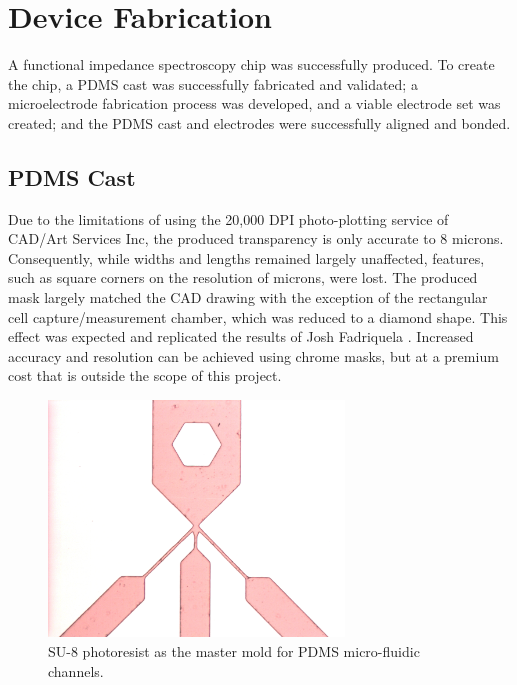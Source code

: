 
\section{Device Fabrication}

\par A functional impedance spectroscopy chip was successfully produced. To create the chip, a PDMS cast was successfully fabricated and validated; a microelectrode fabrication process was developed, and a viable electrode set was created; and the PDMS cast and electrodes were successfully aligned and bonded.

\subsection{PDMS Cast}
\label{sec:PDMS_cast_fabrication}

\par Due to the limitations of using the 20,000 DPI photo-plotting service of CAD/Art Services Inc, the produced transparency is only accurate to 8 microns. Consequently, while widths and lengths remained largely unaffected, features, such as square corners on the resolution of microns, were lost. The produced mask largely matched the CAD drawing with the exception of the rectangular cell capture/measurement chamber, which was reduced to a diamond shape. This effect was expected and replicated the results of Josh Fadriquela \cite{fadriquela_design_2009-1}. Increased accuracy and resolution can be achieved using chrome masks, but at a premium cost that is outside the scope of this project. 

\begin{figure}[H]
    \centering
    \includegraphics[width=0.7\textwidth]{images/su8_results.png}
    \caption{SU-8 photoresist as the master mold for PDMS micro-fluidic channels.}
    \label{fig:su8_results}
\end{figure}

